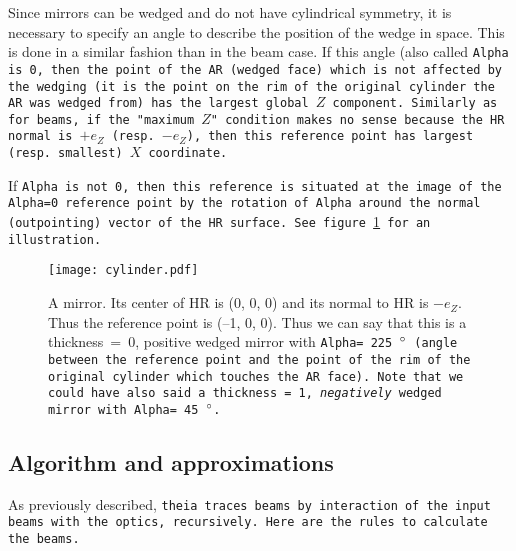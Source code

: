 \documentclass{article}
\begin{document}
Since mirrors can be wedged and do not have cylindrical symmetry, it is necessary to specify an angle to describe the position of the wedge in space. This is done in a similar fashion than in the beam case. If this angle (also called \tt{Alpha} is 0, then the point of the AR (wedged face) which is not affected by the wedging (it is the point on the rim of the original cylinder the AR was wedged from) has the largest global $Z$ component. Similarly as for beams, if the "maximum $Z$" condition makes no sense because the HR normal is  $+ e_Z$ (resp. $-e_Z$), then this reference point has largest (resp. smallest) $X$ coordinate.

If \tt{Alpha} is not 0, then this reference is situated at the image of the \tt{Alpha=0} reference point by the rotation of \tt{Alpha} around the normal (outpointing) vector of the HR surface. See figure \ref{cylinder} for an illustration.


\begin{figure}[h]
\begin{center}
\texttt{[image: cylinder.pdf]}
\caption{A mirror. Its center of HR is (0, 0, 0) and its normal to HR is $-e_Z$. Thus the reference point is (--1, 0, 0). Thus we can say that this is a thickness~=~0, positive wedged mirror with \tt{Alpha=}~225~$\degree$ (angle between the reference point and the point of the rim of the original cylinder which touches the AR face). Note that we could have also said a thickness~=~1, \textit{negatively} wedged mirror with \tt{Alpha=}~45~$\degree$.}
\label{cylinder}
\end{center}
\end{figure}


\subsection{Algorithm and approximations}
As previously described, \tt{theia} traces beams by interaction of the input beams with the optics, recursively. Here are the rules to calculate the beams.
\end{document}
